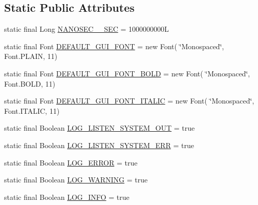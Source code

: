 \subsection*{Static Public Attributes}
\begin{DoxyCompactItemize}
\item 
static final Long \hyperlink{classit_1_1emarolab_1_1cagg_1_1debugging_1_1DebuggingDefaults_aa4ace266347e98c2d5b7fb4d2968e173}{N\-A\-N\-O\-S\-E\-C\-\_\-\_\-\-S\-E\-C} = 1000000000\-L
\item 
static final Font \hyperlink{classit_1_1emarolab_1_1cagg_1_1debugging_1_1DebuggingDefaults_a5f2a7c7991c040d770f864911e79e7ea}{D\-E\-F\-A\-U\-L\-T\-\_\-\-G\-U\-I\-\_\-\-F\-O\-N\-T} = new Font( \char`\"{}Monospaced\char`\"{}, Font.\-P\-L\-A\-I\-N, 11)
\item 
static final Font \hyperlink{classit_1_1emarolab_1_1cagg_1_1debugging_1_1DebuggingDefaults_a1ab0f7cb1f7895f130858530c0eb9443}{D\-E\-F\-A\-U\-L\-T\-\_\-\-G\-U\-I\-\_\-\-F\-O\-N\-T\-\_\-\-B\-O\-L\-D} = new Font( \char`\"{}Monospaced\char`\"{}, Font.\-B\-O\-L\-D, 11)
\item 
static final Font \hyperlink{classit_1_1emarolab_1_1cagg_1_1debugging_1_1DebuggingDefaults_a8a2cfd2c33c9b1c9f18ca44b669463d8}{D\-E\-F\-A\-U\-L\-T\-\_\-\-G\-U\-I\-\_\-\-F\-O\-N\-T\-\_\-\-I\-T\-A\-L\-I\-C} = new Font( \char`\"{}Monospaced\char`\"{}, Font.\-I\-T\-A\-L\-I\-C, 11)
\item 
static final Boolean \hyperlink{classit_1_1emarolab_1_1cagg_1_1debugging_1_1DebuggingDefaults_a2d4710f38eb7e92c5b733f49baefd243}{L\-O\-G\-\_\-\-L\-I\-S\-T\-E\-N\-\_\-\-S\-Y\-S\-T\-E\-M\-\_\-\-O\-U\-T} = true
\item 
static final Boolean \hyperlink{classit_1_1emarolab_1_1cagg_1_1debugging_1_1DebuggingDefaults_a99a53b1245a543cd658a05b4559a8902}{L\-O\-G\-\_\-\-L\-I\-S\-T\-E\-N\-\_\-\-S\-Y\-S\-T\-E\-M\-\_\-\-E\-R\-R} = true
\item 
static final Boolean \hyperlink{classit_1_1emarolab_1_1cagg_1_1debugging_1_1DebuggingDefaults_acd5d57de60e84e4807ede35008bb3d6c}{L\-O\-G\-\_\-\-E\-R\-R\-O\-R} = true
\item 
static final Boolean \hyperlink{classit_1_1emarolab_1_1cagg_1_1debugging_1_1DebuggingDefaults_a609da8270808ac3bf908af33bd454c36}{L\-O\-G\-\_\-\-W\-A\-R\-N\-I\-N\-G} = true
\item 
static final Boolean \hyperlink{classit_1_1emarolab_1_1cagg_1_1debugging_1_1DebuggingDefaults_a029fcf850c3dd1c1aed7c8bc0620ed8a}{L\-O\-G\-\_\-\-I\-N\-F\-O} = true
\item 

\end{DoxyCompactItemize}
